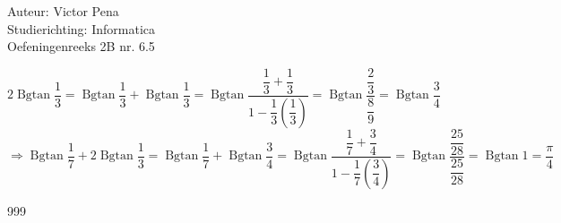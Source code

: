 \documentclass[a4paper]{article}
\newcommand{\Bgtan}{\operatorname{Bgtan}}
\begin{document}
	
	\noindent \large Auteur: Victor Pena \\
	\noindent \large Studierichting: Informatica\\
	\noindent \large Oefeningenreeks 2B nr. 6.5\\
	
	\medskip
	
	\normalsize 
	
	$2\Bgtan\dfrac{1}{3} = \Bgtan\dfrac{1}{3} + \Bgtan\dfrac{1}{3} = \Bgtan\dfrac{\dfrac{1}{3}+\dfrac{1}{3}}{1-\dfrac{1}{3}\left(\dfrac{1}{3}
	\right)} = \Bgtan\dfrac{\dfrac{2}{3}}{\dfrac{8}{9}} =\Bgtan\dfrac{3}{4} $ \\	

	$\Rightarrow \Bgtan\dfrac{1}{7} + 2\Bgtan\dfrac{1}{3} = \Bgtan\dfrac{1}{7} + \Bgtan\dfrac{3}{4} = \Bgtan\dfrac{\dfrac{1}{7}+\dfrac{3}{4}}{1-\dfrac{1}{7}\left(\dfrac{3}{4}\right)} = \Bgtan\dfrac{\dfrac{25}{28}}{\dfrac{25}{28}} =\Bgtan 1 = \dfrac{\pi}{4}$\\
	
	
	\begin{thebibliography}{999}
	\end{thebibliography}
\end{document}
